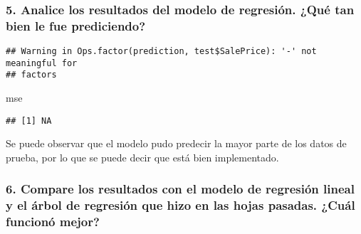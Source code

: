 \documentclass[
]{article}
\newenvironment{Shaded}{\begin{snugshade}}{\end{snugshade}}
\newcommand{\DecValTok}[1]{\textcolor[rgb]{0.00,0.00,0.81}{#1}}
\newcommand{\FunctionTok}[1]{\textcolor[rgb]{0.00,0.00,0.00}{#1}}
\newcommand{\NormalTok}[1]{#1}
\newcommand{\OtherTok}[1]{\textcolor[rgb]{0.56,0.35,0.01}{#1}}
\newcommand{\SpecialCharTok}[1]{\textcolor[rgb]{0.00,0.00,0.00}{#1}}
\begin{document}
\hypertarget{analice-los-resultados-del-modelo-de-regresiuxf3n.-quuxe9-tan-bien-le-fue-prediciendo}{%
\subsubsection{5. Analice los resultados del modelo de regresión. ¿Qué
tan bien le fue
prediciendo?}\label{analice-los-resultados-del-modelo-de-regresiuxf3n.-quuxe9-tan-bien-le-fue-prediciendo}}

\begin{Shaded}
\end{Shaded}

\begin{verbatim}
## Warning in Ops.factor(prediction, test$SalePrice): '-' not meaningful for
## factors
\end{verbatim}

\begin{Shaded}
\begin{Highlighting}[]
\NormalTok{mse}
\end{Highlighting}
\end{Shaded}

\begin{verbatim}
## [1] NA
\end{verbatim}

Se puede observar que el modelo pudo predecir la mayor parte de los
datos de prueba, por lo que se puede decir que está bien implementado.

\hypertarget{compare-los-resultados-con-el-modelo-de-regresiuxf3n-lineal-y-el-uxe1rbol-de-regresiuxf3n-que-hizo-en-las-hojas-pasadas.-cuuxe1l-funcionuxf3-mejor}{%
\subsubsection{6. Compare los resultados con el modelo de regresión
lineal y el árbol de regresión que hizo en las hojas pasadas. ¿Cuál
funcionó
mejor?}\label{compare-los-resultados-con-el-modelo-de-regresiuxf3n-lineal-y-el-uxe1rbol-de-regresiuxf3n-que-hizo-en-las-hojas-pasadas.-cuuxe1l-funcionuxf3-mejor}}
\end{document}
